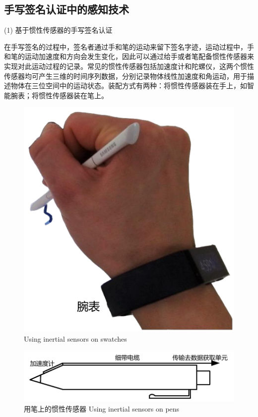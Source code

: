 \subsection{手写签名认证中的感知技术}
(1) 基于惯性传感器的手写签名认证
  
在手写签名的过程中，签名者通过手和笔的运动来留下签名字迹，运动过程中，手和笔的运动加速度和方向会发生变化，因此可以通过给手或者笔配备惯性传感器来实现对此运动过程的记录。常见的惯性传感器包括加速度计和陀螺仪，这两个惯性传感器均可产生三维的时间序列数据，分别记录物体线性加速度和角运动，用于描述物体在三位空间中的运动状态。装配方式有两种：将惯性传感器装在手上，如智能腕表；将惯性传感器装在笔上。

\begin{figure}
  \centering
  \begin{minipage}[t]{0.3\textwidth}
    \centering
    \includegraphics[width=\textwidth]{figure/smartwatch.pdf}
      {Using inertial sensors on swatches}
        \label{fig:smartwatch-inertial-sensor}
  \end{minipage}
  \centering
  \begin{minipage}[t]{0.49\textwidth}
    \centering
    \includegraphics[width=\textwidth]{figure/acceleration-pen.pdf}
    \bicaption
    {用笔上的惯性传感器}
    {Using inertial sensors on pens}
    \label{fig:pen-inertial-sensor}
   \end{minipage}
\end{figure}
